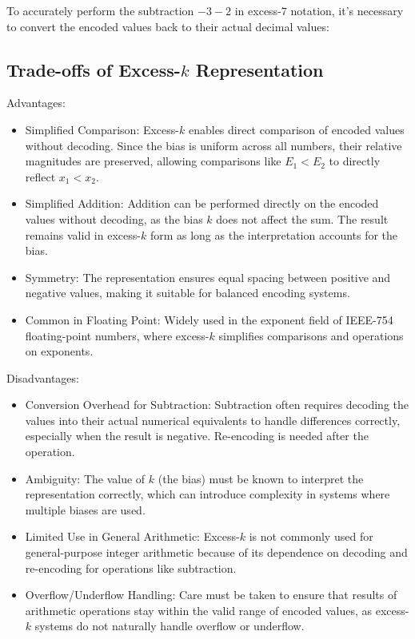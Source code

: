 To accurately perform the subtraction \( -3 - 2 \) in excess-\( 7 \) notation, it's necessary to convert the encoded values back to their actual decimal values:


\subsection{Trade-offs of Excess-\( k \) Representation}
Advantages:
\begin{itemize}[topsep=0pt]
    \item Simplified Comparison: Excess-\( k \) enables direct comparison of encoded values without decoding. Since the bias is uniform across all numbers, their relative magnitudes are preserved, allowing comparisons like \( E_1 < E_2 \) to directly reflect \( x_1 < x_2 \).
    \item Simplified Addition: Addition can be performed directly on the encoded values without decoding, as the bias \( k \) does not affect the sum. The result remains valid in excess-\( k \) form as long as the interpretation accounts for the bias.
    \item Symmetry: The representation ensures equal spacing between positive and negative values, making it suitable for balanced encoding systems.
    \item Common in Floating Point: Widely used in the exponent field of IEEE-754 floating-point numbers, where excess-\( k \) simplifies comparisons and operations on exponents.
\end{itemize}

 \vspace{\baselineskip}\par
\noindent Disadvantages:
\begin{itemize}[topsep=0pt]
    \item Conversion Overhead for Subtraction: Subtraction often requires decoding the values into their actual numerical equivalents to handle differences correctly, especially when the result is negative. Re-encoding is needed after the operation.
    \item Ambiguity: The value of \( k \) (the bias) must be known to interpret the representation correctly, which can introduce complexity in systems where multiple biases are used.
    \item Limited Use in General Arithmetic: Excess-\( k \) is not commonly used for general-purpose integer arithmetic because of its dependence on decoding and re-encoding for operations like subtraction.
    \item Overflow/Underflow Handling: Care must be taken to ensure that results of arithmetic operations stay within the valid range of encoded values, as excess-\( k \) systems do not naturally handle overflow or underflow.
\end{itemize}


